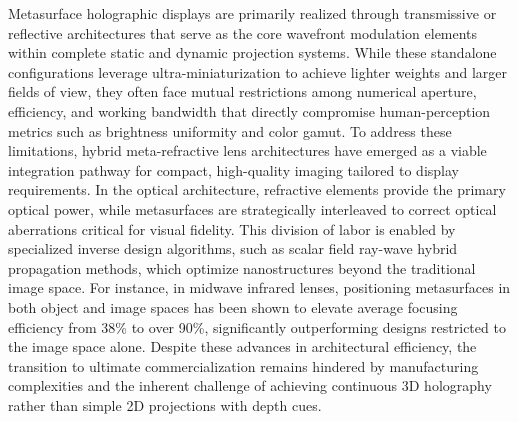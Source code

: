 Metasurface holographic displays are primarily realized through transmissive or reflective architectures that serve as the core wavefront modulation elements within complete static and dynamic projection systems. While these standalone configurations leverage ultra-miniaturization to achieve lighter weights and larger fields of view, they often face mutual restrictions among numerical aperture, efficiency, and working bandwidth that directly compromise human-perception metrics such as brightness uniformity and color gamut. To address these limitations, hybrid meta-refractive lens architectures have emerged as a viable integration pathway for compact, high-quality imaging tailored to display requirements. In the optical architecture, refractive elements provide the primary optical power, while metasurfaces are strategically interleaved to correct optical aberrations critical for visual fidelity. This division of labor is enabled by specialized inverse design algorithms, such as scalar field ray-wave hybrid propagation methods, which optimize nanostructures beyond the traditional image space. For instance, in midwave infrared lenses, positioning metasurfaces in both object and image spaces has been shown to elevate average focusing efficiency from 38\% to over 90\%, significantly outperforming designs restricted to the image space alone. Despite these advances in architectural efficiency, the transition to ultimate commercialization remains hindered by manufacturing complexities and the inherent challenge of achieving continuous 3D holography rather than simple 2D projections with depth cues. \citep{doi_10_1515_nanoph_2025_0269_b999ce93} \citep{doi_10_1364_ao_516890_6221deea}

